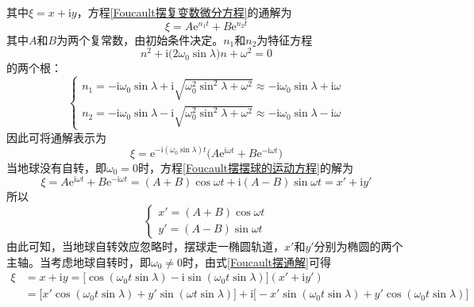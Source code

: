 其中$\xi = x + \mathrm{i}y$，方程\eqref{Foucault摆复变数微分方程}的通解为
\begin{equation*}
	\xi = A\mathrm{e}^{n_1 t} + B\mathrm{e}^{n_2 t}
\end{equation*}
其中$A$和$B$为两个复常数，由初始条件决定。$n_1$和$n_2$为特征方程
\begin{equation*}
	n^2 + \mathrm{i} \big(2\omega_0 \sin \lambda \big) n + \omega^2 = 0
\end{equation*}
的两个根：
\begin{equation*}
\begin{cases}
	n_1 = -\mathrm{i} \omega_0 \sin \lambda + \mathrm{i} \sqrt{\omega_0^2 \sin^2 \lambda + \omega^2} \approx -\mathrm{i} \omega_0 \sin \lambda + \mathrm{i} \omega \\
	n_2 = -\mathrm{i} \omega_0 \sin \lambda - \mathrm{i} \sqrt{\omega_0^2 \sin^2 \lambda + \omega^2} \approx -\mathrm{i} \omega_0 \sin \lambda - \mathrm{i} \omega
\end{cases}
\end{equation*}
因此可将通解表示为
\begin{equation}
	\xi = \mathrm{e}^{-\mathrm{i}(\omega_0\sin \lambda) t} \big(A \mathrm{e}^{\mathrm{i} \omega t} + B \mathrm{e}^{-\mathrm{i} \omega t}\big)
	\label{Foucault摆通解}
\end{equation}
当地球没有自转，即$\omega_0 = 0$时，方程\eqref{Foucault摆摆球的运动方程}的解为
\begin{equation*}
	\xi = A \mathrm{e}^{\mathrm{i} \omega t} + B \mathrm{e}^{-\mathrm{i} \omega t} = (A+B) \cos \omega t + \mathrm{i}(A-B) \sin \omega t = x'+\mathrm{i} y'
\end{equation*}
所以
\begin{equation}
\begin{cases}
	x' = (A+B)\cos \omega t \\
	y' = (A-B)\sin \omega t
\end{cases}
\end{equation}
由此可知，当地球自转效应忽略时，摆球走一椭圆轨道，$x'$和$y'$分别为椭圆的两个主轴。当考虑地球自转时，即$\omega_0 \neq 0$时，由式\eqref{Foucault摆通解}可得
\begin{align*}
	\xi & = x+\mathrm{i} y = \big[\cos(\omega_0 t\sin \lambda)- \mathrm{i} \sin (\omega_0 t\sin \lambda)\big](x'+\mathrm{i} y') \\
	& = \big[x'\cos(\omega_0 t\sin \lambda) + y'\sin(\omega t\sin \lambda)\big] + \mathrm{i} \big[-x'\sin(\omega_0 t\sin \lambda) + y'\cos(\omega_0 t\sin \lambda)\big]
\end{align*}
